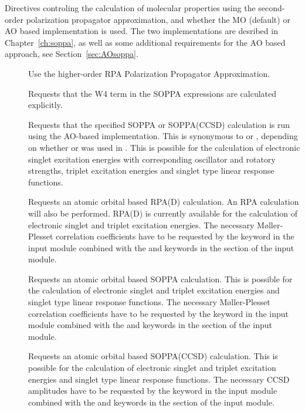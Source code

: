 Directives controling the calculation of molecular properties
using the second-order polarization propagator approximation, and
whether the MO (default) or AO based implementation is used.
The two implementations are desribed in Chapter~\ref{ch:soppa}, 
as well as some additional requirements for the AO based approach, 
see Section~\ref{sec:AOsoppa}.

\begin{description}
\item[] Use the higher-order RPA Polarization Propagator
  Approximation.

\item[] Requests that the W4 term in the SOPPA expressions
  are calculated explicitly.

\item[] Requests that the specified SOPPA or
SOPPA(CCSD) calculation is run using the AO-based implementation.
This is synonymous to  or , depending on whether
 or  was used in .
This is possible for the
calculation of electronic singlet excitation energies with corresponding
oscillator and rotatory strengths, triplet excitation energies and
singlet type linear response functions. 

\item[] Requests an atomic orbital based RPA(D)
calculation. An RPA calculation will also be performed.
RPA(D) is currently available for the calculation of
electronic singlet and triplet excitation energies.
The necessary M{\o}ller-Plesset correlation
coefficients have to be requested by the  keyword in the
 input module combined with the  and
 keywords in the  section of the  input module.

\item[] Requests an atomic orbital based SOPPA
calculation. This is possible for the calculation of
electronic singlet and triplet excitation energies and singlet type linear 
response functions. 
The necessary M{\o}ller-Plesset correlation
coefficients have to be requested by the  keyword in the
 input module combined with the  and
 keywords in the  section of the  input module.

\item[] Requests an atomic orbital based SOPPA(CCSD)
calculation. This is possible for the calculation of
electronic singlet and triplet excitation energies and singlet type 
linear response functions.
The necessary CCSD amplitudes have to be requested by the  keyword 
in the  input module combined with the  and
 keywords in the  section of the  input module.


\end{description}
